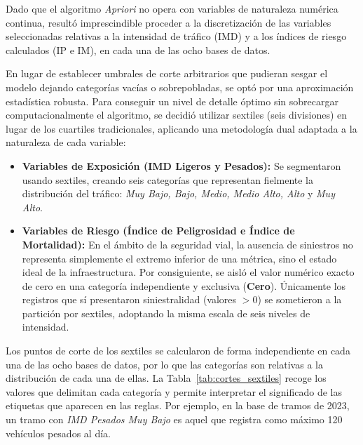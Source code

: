 \documentclass[twoside,a4paper,12pt,onecolumn,openany]{book}
\begin{document}
Dado que el algoritmo \textit{Apriori} no opera con variables de naturaleza numérica continua, resultó imprescindible proceder a la discretización de las variables seleccionadas relativas a la intensidad de tráfico (IMD) y a los índices de riesgo calculados (IP e IM), en cada una de las ocho bases de datos. 

\vspace{0.5cm}

En lugar de establecer umbrales de corte arbitrarios que pudieran sesgar el modelo dejando categorías vacías o sobrepobladas, se optó por una aproximación estadística robusta. Para conseguir un nivel de detalle óptimo sin sobrecargar computacionalmente el algoritmo, se decidió utilizar sextiles (seis divisiones) en lugar de los cuartiles tradicionales, aplicando una metodología dual adaptada a la naturaleza de cada variable:

\begin{itemize}
   
    \item \textbf{Variables de Exposición (IMD Ligeros y Pesados):} Se segmentaron usando sextiles, creando seis categorías que representan fielmente la distribución del tráfico: \textit{Muy Bajo, Bajo, Medio, Medio Alto, Alto} y \textit{Muy Alto}.
    
    \item \textbf{Variables de Riesgo (Índice de Peligrosidad e Índice de Mortalidad):} En el ámbito de la seguridad vial, la ausencia de siniestros no representa simplemente el extremo inferior de una métrica, sino el estado ideal de la infraestructura. Por consiguiente, se aisló el valor numérico exacto de cero en una categoría independiente y exclusiva (\textbf{Cero}). Únicamente los registros que sí presentaron siniestralidad (valores $> 0$) se sometieron a la partición por sextiles, adoptando la misma escala de seis niveles de intensidad.

\end{itemize}

Los puntos de corte de los sextiles se calcularon de forma independiente en cada una de las ocho bases de datos, por lo que las categorías son relativas a la distribución de cada una de ellas. La Tabla~\ref{tab:cortes_sextiles} recoge los valores que delimitan cada categoría y permite interpretar el significado de las etiquetas que aparecen en las reglas. Por ejemplo, en la base de tramos de 2023, un tramo con \textit{IMD Pesados Muy Bajo} es aquel que registra como máximo 120 vehículos pesados al día.
\end{document}
